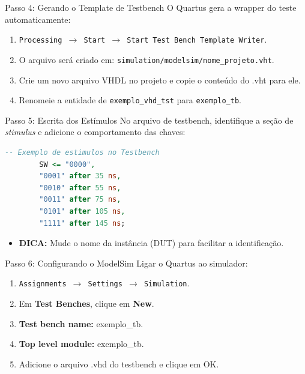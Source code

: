 \documentclass[aspectratio=169]{beamer}
\begin{document}
\begin{frame}{Passo 4: Gerando o Template de Testbench}
	O Quartus gera a wrapper do teste automaticamente:
	\begin{enumerate}
		\item \texttt{Processing $\rightarrow$ Start $\rightarrow$ Start Test Bench Template Writer}.
		\item O arquivo será criado em: \texttt{simulation/modelsim/nome\_projeto.vht}.
		\item Crie um novo arquivo VHDL no projeto e copie o conteúdo do .vht para ele.
		\item Renomeie a entidade de \texttt{exemplo\_vhd\_tst} para \texttt{exemplo\_tb}.
	\end{enumerate}
\end{frame}

















\begin{frame}[fragile]{Passo 5: Escrita dos Estímulos}
	No arquivo de testbench, identifique a seção de \textit{stimulus} e adicione o comportamento das chaves:
	
	\begin{lstlisting}[language=VHDL, basicstyle=\tiny]
		-- Exemplo de estimulos no Testbench
		SW <= "0000", 
		"0001" after 35 ns,
		"0010" after 55 ns,
		"0011" after 75 ns,
		"0101" after 105 ns,
		"1111" after 145 ns;
	\end{lstlisting}
	
	\begin{itemize}
		\item \textbf{DICA:} Mude o nome da instância (DUT) para facilitar a identificação.
	\end{itemize}
\end{frame}





\begin{frame}{Passo 6: Configurando o ModelSim}
	Ligar o Quartus ao simulador:
	\begin{enumerate}
		\item \texttt{Assignments $\rightarrow$ Settings $\rightarrow$ Simulation}.
		\item Em \textbf{Test Benches}, clique em \textbf{New}.
		\item \textbf{Test bench name:} exemplo\_tb.
		\item \textbf{Top level module:} exemplo\_tb.
		\item Adicione o arquivo .vhd do testbench e clique em OK.
	\end{enumerate}
	\begin{figure}
	\end{figure}
\end{frame}
\end{document}
